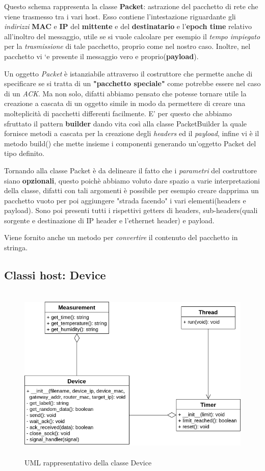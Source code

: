 \documentclass[a4paper,12pt]{report}
\begin{document}
%
Questo schema rappresenta la classe \textbf{Packet}: astrazione del pacchetto di rete che viene trasmesso tra i vari host. Esso contiene l'intestazione riguardante gli \emph{indirizzi} \textbf{MAC} e \textbf{IP} del \textbf{mittente} e del \textbf{destinatario} e l'\textbf{epoch time} relativo all'inoltro del messaggio, utile se si vuole calcolare per esempio il \emph{tempo impiegato} per la \emph{trasmissione} di tale pacchetto, proprio come nel nostro caso. Inoltre, nel pacchetto vi `e presente il messaggio vero e proprio(\textbf{payload}).

Un oggetto \emph{Packet} è istanziabile attraverso il costruttore che permette anche di specificare se si tratta di un \textbf{"pacchetto speciale"} come potrebbe essere nel caso di un \emph{ACK}. 
%
Ma non solo, difatti abbiamo pensato che potesse tornare utile la creazione a cascata di un oggetto simile in modo da permettere di creare una molteplicità di pacchetti differenti facilmente.
%
E' per questo che abbiamo sfruttato il pattern \textbf{builder} dando vita così alla classe PacketBuilder la quale fornisce metodi a cascata per la creazione degli \emph{headers} ed il \emph{payload}, infine vi è il metodo build() che mette insieme i componenti generando un'oggetto Packet del tipo definito.

Tornando alla classe Packet è da delineare il fatto che i \emph{parametri} del costruttore siano \textbf{opzionali}, questo poichè abbiamo voluto dare spazio a varie interpretazioni della classe, difatti con tali argomenti è possibile per esempio creare dapprima un pacchetto vuoto per poi aggiungere "strada facendo" i vari elementi(headers e payload).
%
Sono poi presenti tutti i rispettivi getters di headers, sub-headers(quali sorgente e destinazione di IP header e l'ethernet header) e payload.

Viene fornito anche un metodo per \emph{convertire} il contenuto del pacchetto in stringa.

\subsection{Classi host: Device}

\begin{figure}[H]
\centering{}
\includegraphics[width=\textwidth,height=23em]{img/UML_Device_Timer.png}
\caption{UML rappresentativo della classe Device}
\label{img:uml_device_timer}
\end{figure}
\end{document}
